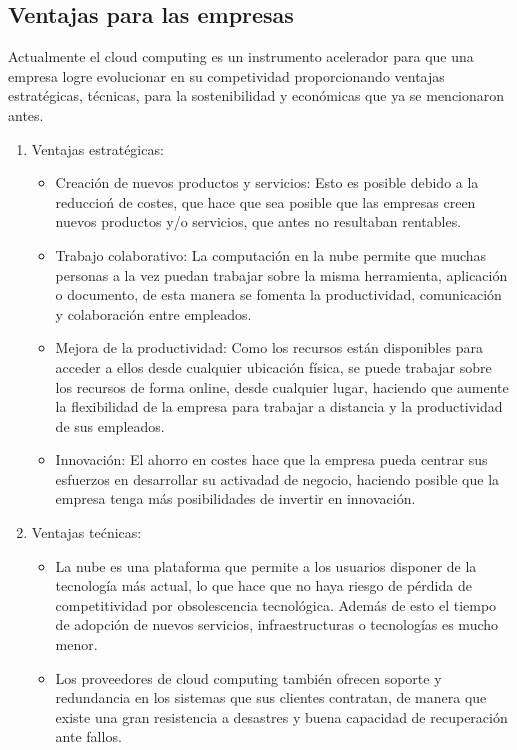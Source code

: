 \documentclass[a4paper, 12pt]{report}
\begin{document}
\subsection{Ventajas para las empresas}
\begin{justify}
Actualmente el cloud computing es un instrumento acelerador para que una empresa logre evolucionar en su competividad proporcionando ventajas estrat\'egicas, t\'ecnicas, para la sostenibilidad y econ\'omicas que ya se mencionaron antes.
\begin{enumerate}[label=\alph*)]
    \item{Ventajas estrat\'egicas:} 
				\begin{itemize}
						\item{Creaci\'on de nuevos productos y servicios: } Esto es posible debido a la reduccio\'n de 	costes, que hace que sea posible que las empresas creen nuevos productos y/o servicios, que antes no resultaban rentables.
						\item{Trabajo colaborativo: } La computaci\'on en la nube permite que muchas personas a la vez puedan trabajar sobre la misma herramienta, aplicaci\'on o documento, de esta manera se fomenta la productividad, comunicaci\'on y colaboraci\'on entre empleados.
						\item{Mejora de la productividad: } Como los recursos est\'an disponibles para acceder a ellos desde cualquier ubicaci\'on f\'isica, se puede trabajar sobre los recursos de forma online, desde cualquier lugar, haciendo que aumente la flexibilidad de la empresa para trabajar a distancia y la productividad de sus empleados.
						\item{Innovaci\'on: } El ahorro en costes hace que la empresa pueda centrar sus esfuerzos en desarrollar su activadad de negocio, haciendo posible que la empresa tenga m\'as posibilidades de invertir en innovaci\'on.
				\end{itemize}
		\newpage
    \item{Ventajas te\'cnicas:}
				\begin{itemize}
						\item{}La nube es una plataforma que permite a los usuarios disponer de la tecnolog\'ia m\'as actual, lo que hace que no haya riesgo de p\'erdida de competitividad por obsolescencia tecnol\'ogica. Adem\'as de esto el tiempo de adopci\'on de nuevos servicios, infraestructuras o tecnolog\'ias es mucho menor. 
						\item{}Los proveedores de cloud computing tambi\'en ofrecen soporte y redundancia en los sistemas que sus clientes contratan, de manera que existe una gran resistencia a desastres y buena capacidad de recuperación ante fallos.

\end{itemize}
\end{enumerate}
\end{justify}
\end{document}
